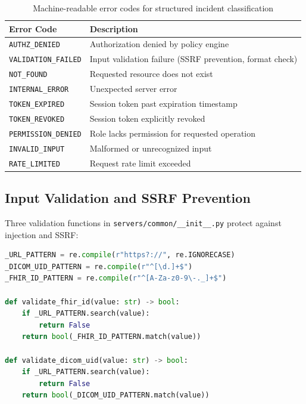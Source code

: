 \documentclass[10pt,letterpaper]{article}
\begin{document}
\begin{table}[H]
\centering
\caption{Machine-readable error codes for structured incident classification}
\label{tab:errors}
\small
\begin{tabularx}{\textwidth}{l X}
\toprule
\textbf{Error Code} & \textbf{Description} \\
\midrule
\texttt{AUTHZ\_DENIED} & Authorization denied by policy engine \\
\texttt{VALIDATION\_FAILED} & Input validation failure (SSRF prevention, format check) \\
\texttt{NOT\_FOUND} & Requested resource does not exist \\
\texttt{INTERNAL\_ERROR} & Unexpected server error \\
\texttt{TOKEN\_EXPIRED} & Session token past expiration timestamp \\
\texttt{TOKEN\_REVOKED} & Session token explicitly revoked \\
\texttt{PERMISSION\_DENIED} & Role lacks permission for requested operation \\
\texttt{INVALID\_INPUT} & Malformed or unrecognized input \\
\texttt{RATE\_LIMITED} & Request rate limit exceeded \\
\bottomrule
\end{tabularx}
\end{table}

\subsection{Input Validation and SSRF Prevention}

Three validation functions in \texttt{servers/common/\_\_init\_\_.py} protect against injection and SSRF:

\begin{lstlisting}[language=Python,title={\textbf{Input Validation Functions (v0.2.0)}}]
_URL_PATTERN = re.compile(r"https?://", re.IGNORECASE)
_DICOM_UID_PATTERN = re.compile(r"^[\d.]+$")
_FHIR_ID_PATTERN = re.compile(r"^[A-Za-z0-9\-._]+$")

def validate_fhir_id(value: str) -> bool:
    if _URL_PATTERN.search(value):
        return False
    return bool(_FHIR_ID_PATTERN.match(value))

def validate_dicom_uid(value: str) -> bool:
    if _URL_PATTERN.search(value):
        return False
    return bool(_DICOM_UID_PATTERN.match(value))
\end{lstlisting}
\end{document}
